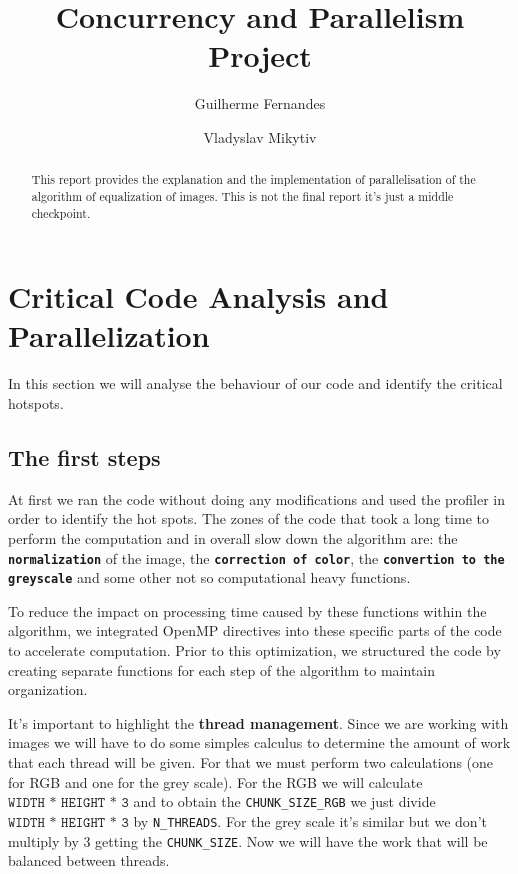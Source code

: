 \documentclass[sigconf]{acmart}
\begin{document}
\title{Concurrency and Parallelism Project}


\author{Guilherme Fernandes}

\author{Vladyslav Mikytiv}


\begin{abstract}
This report provides the explanation and the implementation of parallelisation of the algorithm of equalization of images. This is not the final report it's just a middle checkpoint.

\end{abstract}




\maketitle

\section{Critical Code Analysis and Parallelization}
In this section we will analyse the behaviour of our code and identify the critical hotspots.
\subsection{The first steps}

At first we ran the code without doing any modifications and used the profiler in order to identify the hot spots.
The zones of the code that took a long time to perform the computation and in overall slow down the algorithm are:
the \textbf{\texttt{normalization}} of the image, the \textbf{\texttt{correction of color}}, the \textbf{\texttt{convertion to the greyscale}} and some other
not so computational heavy functions. 

 To reduce the impact on processing time caused by these functions within the algorithm, we integrated OpenMP directives into these specific parts of the code to accelerate computation. Prior to this optimization, we structured the code by creating separate functions for each step of the algorithm to maintain organization.
 
 It's important to highlight the \textbf{thread management}. Since we are working with images we will have to do some simples calculus to determine the amount of work that
 each thread will be given. For that we must perform two calculations (one for RGB and one for the grey scale). For the RGB  we will calculate $\texttt{WIDTH * HEIGHT * 3}$ and to obtain the \texttt{CHUNK\_SIZE\_RGB} we just divide $\texttt{WIDTH * HEIGHT * 3}$  by \texttt{N\_THREADS}. For the grey scale it's similar but we don't multiply by 3 getting the \texttt{CHUNK\_SIZE}. Now we will have the work that will be balanced between threads.
 
\end{document}
